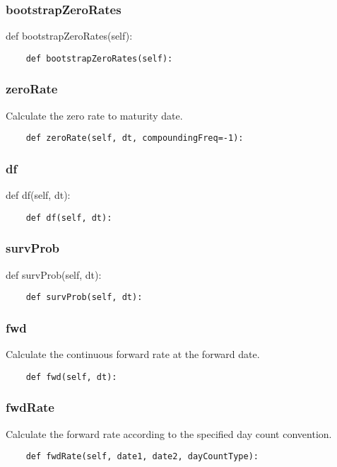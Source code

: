 \documentclass[twoside,11pt]{book}
\begin{document}
\subsubsection*{{\bf bootstrapZeroRates}}
def bootstrapZeroRates(self): 

\begin{lstlisting}
    def bootstrapZeroRates(self):
\end{lstlisting}

\subsubsection*{{\bf zeroRate}}
Calculate the zero rate to maturity date.  

\begin{lstlisting}
    def zeroRate(self, dt, compoundingFreq=-1):
\end{lstlisting}

\subsubsection*{{\bf df}}
def df(self, dt): 

\begin{lstlisting}
    def df(self, dt):
\end{lstlisting}

\subsubsection*{{\bf survProb}}
def survProb(self, dt): 

\begin{lstlisting}
    def survProb(self, dt):
\end{lstlisting}

\subsubsection*{{\bf fwd}}
Calculate the continuous forward rate at the forward date.  

\begin{lstlisting}
    def fwd(self, dt):
\end{lstlisting}

\subsubsection*{{\bf fwdRate}}
Calculate the forward rate according to the specified day count convention.  

\begin{lstlisting}
    def fwdRate(self, date1, date2, dayCountType):
\end{lstlisting}
\end{document}
